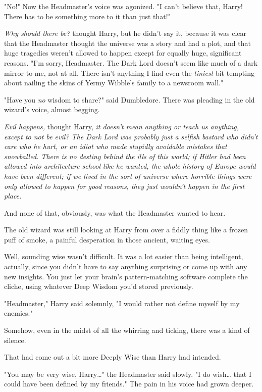 "No!" Now the Headmaster's voice was agonized. "I can't believe that, Harry! 
There has to be something more to it than just that!"

\emph{Why should there be?} thought Harry, but he didn't say it, because it was 
clear that the Headmaster thought the universe was a story and had a plot, and 
that huge tragedies weren't allowed to happen except for equally huge, 
significant reasons. "I'm sorry, Headmaster. The Dark Lord doesn't seem like 
much of a dark mirror to me, not at all. There isn't anything I find even the 
\emph{tiniest} bit tempting about nailing the skins of Yermy Wibble's family to 
a newsroom wall."

"Have you \emph{no} wisdom to share?" said Dumbledore. There was pleading in 
the old wizard's voice, almost begging.

\emph{Evil happens,} thought Harry, \emph{it doesn't mean anything or teach us 
anything, except to not be evil? The Dark Lord was probably just a selfish 
bastard who didn't care who he hurt, or an idiot who made stupidly avoidable 
mistakes that snowballed. There is no destiny behind the ills of this world; if 
Hitler had been allowed into architecture school like he wanted, the whole 
history of Europe would have been different; if we lived in the sort of 
universe where horrible things were only allowed to happen for good reasons, 
they just wouldn't happen in the first place.}

And none of that, obviously, was what the Headmaster wanted to hear.

The old wizard was still looking at Harry from over a fiddly thing like a 
frozen puff of smoke, a painful desperation in those ancient, waiting eyes.

Well, sounding wise wasn't difficult. It was a lot easier than being 
intelligent, actually, since you didn't have to say anything surprising or come 
up with any new insights. You just let your brain's pattern-matching software 
complete the cliche, using whatever Deep Wisdom you'd stored previously.

"Headmaster," Harry said solemnly, "I would rather not define myself by my 
enemies."

Somehow, even in the midst of all the whirring and ticking, there was a kind of 
silence.

That had come out a bit more Deeply Wise than Harry had intended.

"You may be very wise, Harry{\ldots}" the Headmaster said slowly. "I do 
wish{\ldots} that I could have been defined by my friends." The pain in his 
voice had grown deeper.

